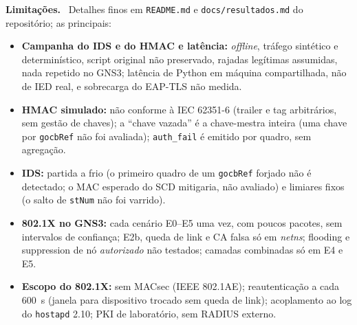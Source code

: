 \documentclass[12pt]{article}
\renewcommand{\paragraph}[1]{\par\noindent\textbf{#1}\ }
\begin{document}
\paragraph{Limita\c{c}\~oes.} Detalhes finos em \texttt{README.md} e \texttt{docs/resultados.md} do reposit\'orio; as principais:
\begin{itemize}
  \item \textbf{Campanha do IDS e do HMAC e lat\^encia:} \emph{offline}, tr\'afego sint\'etico e determin\'istico, script original n\~ao preservado, rajadas leg\'itimas assumidas, nada repetido no GNS3; lat\^encia de Python em m\'aquina compartilhada, n\~ao de IED real, e sobrecarga do EAP-TLS n\~ao medida.
  \item \textbf{HMAC simulado:} n\~ao conforme \`a IEC 62351-6 (trailer e tag arbitr\'arios, sem gest\~ao de chaves); a ``chave vazada'' \'e a chave-mestra inteira (uma chave por \texttt{gocbRef} n\~ao foi avaliada); \texttt{auth\_fail} \'e emitido por quadro, sem agrega\c{c}\~ao.
  \item \textbf{IDS:} partida a frio (o primeiro quadro de um \texttt{gocbRef} forjado n\~ao \'e detectado; o MAC esperado do SCD mitigaria, n\~ao avaliado) e limiares fixos (o salto de \texttt{stNum} n\~ao foi varrido).
  \item \textbf{802.1X no GNS3:} cada cen\'ario E0--E5 uma vez, com poucos pacotes, sem intervalos de confian\c{c}a; E2b, queda de link e CA falsa s\'o em \emph{netns}; flooding e suppression de n\'o \emph{autorizado} n\~ao testados; camadas combinadas s\'o em E4 e E5.
  \item \textbf{Escopo do 802.1X:} sem MACsec (IEEE 802.1AE); reautentica\c{c}\~ao a cada 600~s (janela para dispositivo trocado sem queda de link); acoplamento ao log do \texttt{hostapd} 2.10; PKI de laborat\'orio, sem RADIUS externo.
\end{itemize}
\end{document}
